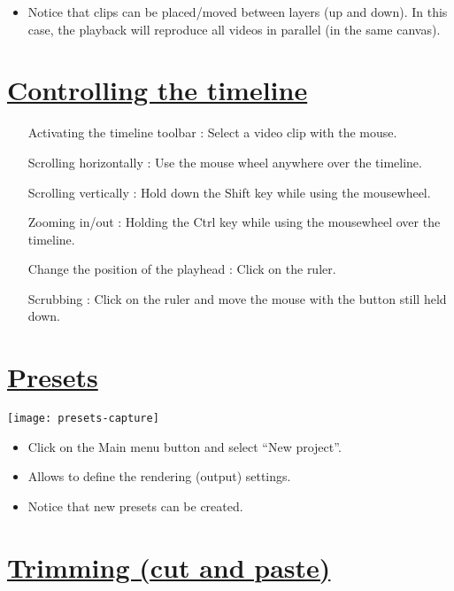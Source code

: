 \begin{itemize}
\item Notice that clips can be placed/moved between layers (up and down). In this case, the playback will reproduce all videos in parallel (in the same canvas).
\end{itemize}


\chapter{\href{http://www.pitivi.org/manual/movearoundtimeline.html}{Controlling the timeline}}

\begin{enumerate}
\item [Activating the timeline toolbar]: Select a video clip with the mouse.
\item [Scrolling horizontally]: Use the mouse wheel anywhere over the
  timeline.
\item [Scrolling vertically]: Hold down the Shift key while using the
  mousewheel.
\item [Zooming in/out]: Holding the Ctrl key while using the
  mousewheel over the timeline.
\item [Change the position of the playhead]: Click on the ruler.
\item [Scrubbing]: Click on the ruler and move the mouse with the
  button still held down.
\end{enumerate}


\chapter{\href{http://www.pitivi.org/manual/presets.html}{Presets}}

\begin{center}
\texttt{[image: presets-capture]}
\end{center}

\begin{itemize}
\item Click on the Main menu button and select ``New project''.
\item Allows to define the rendering (output) settings.
\item Notice that new presets can be created.
\end{itemize}


\chapter{\href{http://www.pitivi.org/manual/trimming.html}{Trimming (cut and paste)}}

